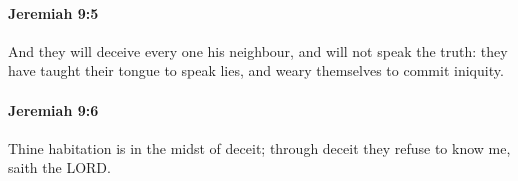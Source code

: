 		\paragraph{Jeremiah 9:5} %
			\label{JEREMIAH-9-5}

			And they will deceive every one his neighbour, and will not speak the truth: they have taught their tongue to speak lies, and weary themselves to commit iniquity.


		\paragraph{Jeremiah 9:6} %
			\label{JEREMIAH-9-6}

			Thine habitation is in the midst of deceit; through deceit they refuse to know me, saith the LORD.


